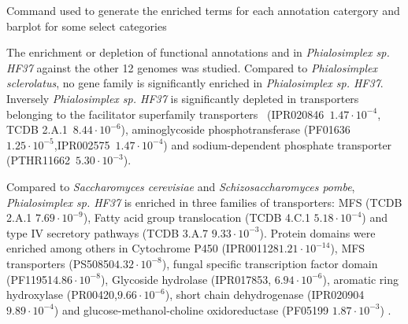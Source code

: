 \documentclass[fontsize=10pt, paper=a4,fleqn, ]{wlscirep}
\newcommand{\E}[2]{${#1}\cdot10^{-{#2}}$}
\newcommand{\TODO}[1]{\textbf{\color{red}{#1}}}
\newcommand{\sacCer}{\textit{Saccharomyces cerevisiae}}
\newcommand{\schPom}{\textit{Schizosaccharomyces pombe}}
\newcommand{\phiSp}{\textit{Phialosimplex sp. HF37}}
\newcommand{\phiScl}{\textit{Phialosimplex sclerolatus}}
\begin{document}
\begin{listing}
  \label{code:enrichedTerm}
  \caption{Command used to generate the enriched terms for each
    annotation catergory and barplot for some select categories}
\end{listing}
\fi

% 
%

The enrichment or depletion of functional annotations and 
in {\phiSp} against the other 12 genomes was studied. Compared to
{\phiScl}, no gene family is significantly enriched in {\phiSp}. Inversely
{\phiSp} is significantly depleted in transporters belonging to the
facilitator superfamily transporters~\TODO{Was seen in bacteria check reference} (IPR020846~\E{1.47}{4}, TCDB
2.A.1~\E{8.44}{6}),  aminoglycoside phosphotransferase
(PF01636~\E{1.25}{5},IPR002575~\E{1.47}{4}) and sodium-dependent phosphate
transporter (PTHR11662~\E{5.30}{3}). 

Compared to {\sacCer} and {\schPom}, {\phiSp} is enriched in three
families of transporters: MFS (TCDB 2.A.1 \E{7.69}{9}), Fatty acid
group translocation (TCDB 4.C.1 \E{5.18}{4}) and type IV secretory
pathways (TCDB 3.A.7 \E{9.33}{3}). Protein domains were enriched among
others in Cytochrome P450 (IPR001128\E{1.21}{14}), MFS transporters
(PS50850\E{4.32}{8}), fungal specific transcription factor domain
(PF11951\E{4.86}{8}), Glycoside hydrolase (IPR017853, \E{6.94}{6}),
aromatic ring hydroxylase (PR00420,\E{9.66}{6}), short chain
dehydrogenase (IPR020904\E{9.89}{4}) and glucose-methanol-choline
oxidoreductase (PF05199 \E{1.87}{3}) \TODO{MICHT BE INVOLVED IN
    OSMOTOLERANCE}. 
\end{document}
